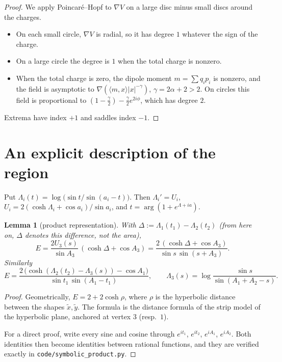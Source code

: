 \documentclass[11pt]{amsart}
\newtheorem{lemma}[theorem]{Lemma}
\theoremstyle{remark}
\begin{document}
\begin{proof}
We apply Poincar\'e--Hopf to $\nabla V$ on a large disc minus small discs around the charges.
\begin{itemize}
\item On each small circle, $\nabla V$ is radial, so it has degree $1$ whatever the sign of the charge.
\item On a large circle the degree is $1$ when the total charge is nonzero.
\item When the total charge is zero, the dipole moment $m=\sum q_ip_i$ is nonzero, and the field is asymptotic to
  $\nabla(\langle m,x\rangle|x|^{-\gamma})$, $\gamma=2\alpha+2>2$. On circles this field is proportional to
  $(1-\tfrac\gamma2)-\tfrac\gamma2e^{2i\phi}$, which has degree $2$.
\end{itemize}
Extrema have index $+1$ and saddles index $-1$.
\end{proof}

\section{An explicit description of the region}

Put $\Lambda_i(t)=\log\bigl(\sin t/\sin(a_i-t)\bigr)$. Then $\Lambda_i'=U_i$,
$U_i=2(\cosh\Lambda_i+\cos a_i)/\sin a_i$, and $t=\arg(1+e^{\Lambda+ia})$.

\begin{lemma}[product representation]\label{lem:product}
With $\Delta:=\Lambda_1(t_1)-\Lambda_2(t_2)$ (from here on, $\Delta$ denotes this difference, not the area),
\[
  E=\frac{2U_3(s)}{\sin A_3}\,(\cosh\Delta+\cos A_3)=\frac{2\,(\cosh\Delta+\cos A_3)}{\sin s\,\sin(s+A_3)} .
\]
Similarly
\[
  E=\frac{2\,\bigl(\cosh(\Lambda_2(t_2)-\Lambda_3(s))-\cos A_1\bigr)}{\sin t_1\,\sin(A_1-t_1)},\qquad
  \Lambda_3(s)=\log\frac{\sin s}{\sin(A_1+A_2-s)} .
\]
\end{lemma}

\begin{proof}
Geometrically, $E=2+2\cosh\rho$, where $\rho$ is the hyperbolic distance between the shapes $\tilde x,\tilde y$. The
formula is the distance formula of the strip model of the hyperbolic plane, anchored at vertex $3$ (resp.\ $1$).

For a direct proof, write every sine and cosine through $e^{it_1}$, $e^{it_2}$, $e^{iA_1}$, $e^{iA_2}$. Both identities
then become identities between rational functions, and they are verified exactly in
\texttt{code/symbolic\_product.py}.
\end{proof}
\end{document}
